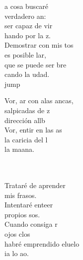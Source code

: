 \begin{cancion}%
	a cosa buscaré\\
	 verdadero an: \\
	ser capaz de vir\\
	hando por la z.\\
	Demostrar con mis tos\\
	 es posible lar,\\
	que se puede ser bre\\
	cando la udad. \\jump\\
	\begin{chorus}%
	Vor, ar con alas ancas,\\
	salpicadas de z\\
	dirección allb\\
	Vor, entir en las as\\
	la caricia del l\\
	la maana.\\
	\end{chorus}%
	\jump\\
	\jump\\
Trataré de aprender\\
	mis frasos.\\
	Intentaré enteer\\
	 propios sos.\\
	Cuando consiga r\\
	 ojos clos\\
	habré emprendido eluelo\\
	ia lo ao.  \\
\end{cancion}%
